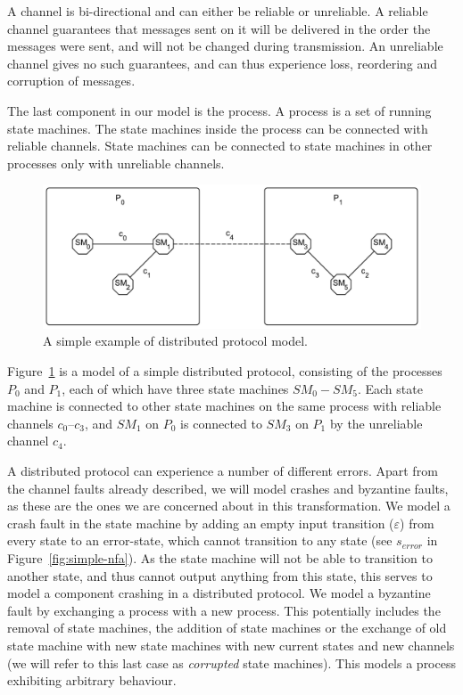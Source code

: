 \documentclass{article}
\begin{document}
	A channel is bi-directional and can either be reliable or unreliable.
	A reliable channel guarantees that messages sent on it will be delivered in the order the messages were sent, and will not be changed during transmission.
	An unreliable channel gives no such guarantees, and can thus experience loss, reordering and corruption of messages.

	The last component in our model is the process.
	A process is a set of running state machines.
	The state machines inside the process can be connected with reliable channels.
	State machines can be connected to state machines in other processes only with unreliable channels.

	\begin{figure}
		\center
		\includegraphics[scale=0.6]{figures/state-machines/Distributed-protocol-model.pdf}
		\caption{A simple example of distributed protocol model.\label{fig:simple-model}}
	\end{figure}
	\FloatBarrier

	Figure~\ref{fig:simple-model} is a model of a simple distributed protocol, consisting of the processes $P_0$ and $P_1$, each of which have three state machines $SM_0 - SM_5$.
	Each state machine is connected to other state machines on the same process with reliable channels $c_0$--$c_3$, and $SM_1$ on $P_0$ is connected to $SM_3$ on $P_1$ by the unreliable channel $c_4$.

	A distributed protocol can experience a number of different errors.
	Apart from the channel faults already described, we will model crashes and byzantine faults, as these are the ones we are concerned about in this transformation.
	We model a crash fault in the state machine by adding an empty input transition ($\varepsilon$) from every state to an error-state, which cannot transition to any state (see $s_{error}$ in Figure~\ref{fig:simple-nfa}).
	As the state machine will not be able to transition to another state, and thus cannot output anything from this state, this serves to model a component crashing in a distributed protocol.
	We model a byzantine fault by exchanging a process with a new process.
	This potentially includes the removal of state machines, the addition of state machines or the exchange of old state machine with new state machines with new current states and new channels (we will refer to this last case as \textit{corrupted} state machines).
	This models a process exhibiting arbitrary behaviour.
\end{document}
